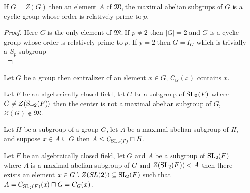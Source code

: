 \begin{lemma}
  \label{MaximalAbelianSubgroup.IsCyclic_and_card_Coprime_CharP_of_center_eq}
  \leanok
  If $G = Z(G)$ then an element $A$ of $\mathfrak{M}$, the maximal abelian subgrups of $G$ is a cyclic group whose order is relatively prime to $p$.
\end{lemma}
\begin{proof}
  Here $G$ is the only element of $\mathfrak{M}$. If $p \neq 2$ then $|G|=2$ and $G$ is a cyclic group whose order is relatively prime to $p$. If $p=2$ then $G = I_G$ which is trivially a $S_p$-subgroup. \\
\end{proof}

\begin{remark}
  \label{mem_centralizer_self}
  \leanok
 Let $G$ be a group then centralizer of an element $x \in G$, $C_G(x)$ contains $x$. 
\end{remark}

\begin{lemma}
  \label{MaximalAbelianSubgroup.center_not_mem}
  \leanok
  Let $F$ be an algebraically closed field, let $G$ be a subgroup of $\operatorname{SL}_2(F)$ where $G \ne Z(\operatorname{SL}_2(F))$ then the center is not a maximal abelian subgroup of $G$, $Z(G) \notin \mathfrak{M}$.
\end{lemma}

\begin{lemma}
  \label{MaximalAbelianSubgroup.le_centralizer_meet}
  \leanok

  Let $H$ be a subgroup of a group $G$, let $A$ be a maximal abelian subgroup of $H$, and suppose $x \in A \subseteq G$ then 
  $A \le C_{\operatorname{SL}_2(F)} \sqcap H$.
\end{lemma}

\begin{lemma}
  \label{MaximalAbelianSubgroup.eq_centralizer_meet_of_center_lt}
  \leanok
  Let $F$ be an algebraically closed field, let $G$ and $A$ be a subgroup of $\operatorname{SL}_2(F)$ where $A$ is a maximal abelian subgroup of $G$ and $Z(\operatorname{SL}_2(F)) < A$ then there exists an element $x \in G \setminus Z(SL(2)) \subseteq \operatorname{SL}_2(F)$ such that
  $A = C_{\operatorname{SL}_2(F)}(x) \sqcap G = C_{G}(x)$.
\end{lemma}

